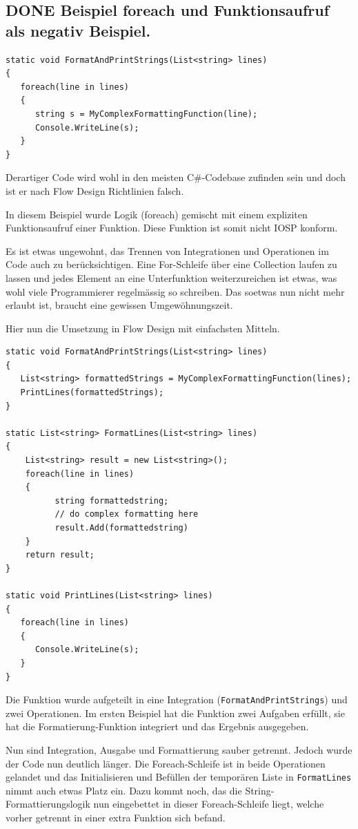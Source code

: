\documentclass[11pt]{article}
\begin{document}
\subsection{{\bfseries\sffamily DONE} Beispiel foreach und Funktionsaufruf als negativ Beispiel.}
\label{sec:orgheadline41}
\begin{verbatim}
static void FormatAndPrintStrings(List<string> lines)
{
   foreach(line in lines)
   {
      string s = MyComplexFormattingFunction(line);
      Console.WriteLine(s);
   }
}
\end{verbatim}
Derartiger Code wird wohl in den meisten C\#-Codebase zufinden sein und doch ist er nach Flow Design Richtlinien falsch.

In diesem Beispiel wurde Logik (foreach) gemischt mit einem expliziten Funktionsaufruf einer Funktion.
Diese Funktion ist somit nicht IOSP konform.

Es ist etwas ungewohnt, das Trennen von Integrationen und Operationen im Code auch zu berücksichtigen.
Eine For-Schleife über eine Collection laufen zu lassen und jedes Element an eine Unterfunktion weiterzureichen ist etwas,
was wohl viele Programmierer regelmässig so schreiben.
Das soetwas nun nicht mehr erlaubt ist, braucht eine gewissen Umgewöhnungszeit.


Hier nun die Umsetzung in Flow Design mit einfachsten Mitteln.



\begin{verbatim}
static void FormatAndPrintStrings(List<string> lines)
{
   List<string> formattedStrings = MyComplexFormattingFunction(lines);
   PrintLines(formattedStrings);
}

static List<string> FormatLines(List<string> lines)
{
    List<string> result = new List<string>();
    foreach(line in lines)
    {
          string formattedstring;
          // do complex formatting here
          result.Add(formattedstring) 
    }
    return result;
}

static void PrintLines(List<string> lines)
{
   foreach(line in lines)
   {
      Console.WriteLine(s);
   }
}
\end{verbatim}

Die Funktion wurde aufgeteilt in eine Integration (\texttt{FormatAndPrintStrings}) und zwei Operationen.
Im ersten Beispiel hat die Funktion zwei Aufgaben erfüllt, sie hat die Formatierung-Funktion integriert und 
das Ergebnis ausgegeben.

Nun sind Integration, Ausgabe und Formattierung sauber getrennt.
Jedoch wurde der Code nun deutlich länger. Die Foreach-Schleife ist in beide Operationen gelandet und das Initialisieren und
Befüllen der temporären Liste in \texttt{FormatLines} nimmt auch etwas Platz ein.
Dazu kommt noch, das die String-Formattierungslogik nun eingebettet in dieser Foreach-Schleife liegt, welche vorher getrennt in
einer extra Funktion sich befand. 
\end{document}

